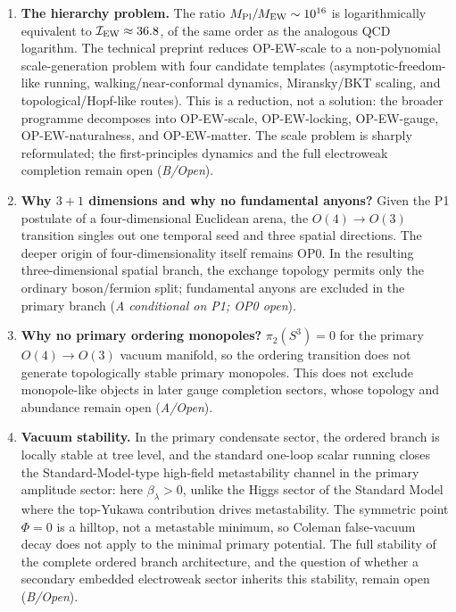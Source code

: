 \documentclass[11pt,a4paper]{article}
\begin{document}
\begin{enumerate}
\item \textbf{The hierarchy problem.} The ratio $M_{\rm Pl}/M_{\rm EW}\sim10^{16}$ is logarithmically equivalent to $\mathcal{I}_{\rm EW}\approx36.8$, of the same order as the analogous QCD logarithm. The technical preprint reduces OP-EW-scale to a non-polynomial scale-generation problem with four candidate templates (asymptotic-freedom-like running, walking/near-conformal dynamics, Miransky/BKT scaling, and topological/Hopf-like routes). This is a reduction, not a solution: the broader programme decomposes into OP-EW-scale, OP-EW-locking, OP-EW-gauge, OP-EW-naturalness, and OP-EW-matter. The scale problem is sharply reformulated; the first-principles dynamics and the full electroweak completion remain open (\emph{B/Open}).

\item \textbf{Why $3+1$ dimensions and why no fundamental anyons?} Given the P1 postulate of a four-dimensional Euclidean arena, the $O(4)\to O(3)$ transition singles out one temporal seed and three spatial directions. The deeper origin of four-dimensionality itself remains OP0. In the resulting three-dimensional spatial branch, the exchange topology permits only the ordinary boson/fermion split; fundamental anyons are excluded in the primary branch (\emph{A conditional on P1; OP0 open}).

\item \textbf{Why no primary ordering monopoles?} $\pi_2(S^3)=0$ for the primary $O(4)\to O(3)$ vacuum manifold, so the ordering transition does not generate topologically stable primary monopoles. This does not exclude monopole-like objects in later gauge completion sectors, whose topology and abundance remain open (\emph{A/Open}).

\item \textbf{Vacuum stability.} In the primary condensate sector, the ordered branch is locally stable at tree level, and the standard one-loop scalar running closes the Standard-Model-type high-field metastability channel in the primary amplitude sector: here $\beta_\lambda>0$, unlike the Higgs sector of the Standard Model where the top-Yukawa contribution drives metastability. The symmetric point $\Phi=0$ is a hilltop, not a metastable minimum, so Coleman false-vacuum decay does not apply to the minimal primary potential. The full stability of the complete ordered branch architecture, and the question of whether a secondary embedded electroweak sector inherits this stability, remain open (\emph{B/Open}).


\end{enumerate}
\end{document}
